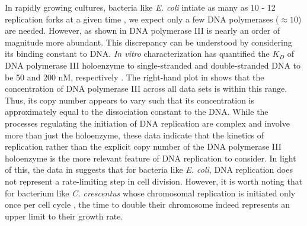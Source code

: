 In rapidly growing cultures, bacteria like \textit{E. coli}
intiate
as many as 10 - 12 replication forks at a
given time \citep{bremer2008, si2017},  we expect only a few DNA polymerases
($\approx 10$) are needed. However, as shown in  DNA
polymerase III is nearly an order of magnitude more abundant. This discrepancy
can be understood by considering its binding constant to DNA.
\textit{In vitro} characterization has quantified the $K_D$ of
DNA polymerase III holoenzyme to single-stranded and double-stranded DNA to be
50 and 200 nM, respectively \citep{ason2000}. The right-hand plot in
 shows that the concentration of DNA polymerase III
across all data sets is within this range. Thus,
its copy number appears to vary such that its
concentration is approximately equal to the dissociation constant to the DNA.
While the processes regulating the initiation of DNA replication are complex and
involve more than just the holoenzyme, these data indicate that the kinetics of
replication rather than the explicit copy number of the DNA polymerase III
holoenzyme is the more relevant feature of DNA replication to consider. In light
of this, the data in  suggests that for bacteria like
\textit{E. coli}, DNA replication does not represent a rate-limiting step in
cell division. However, it is worth noting that for bacterium like \textit{C.
crescentus} whose chromosomal replication is initiated only once per cell cycle
\citep{jensen2001}, the time to double their chromosome indeed represents an
upper limit to their growth rate.
